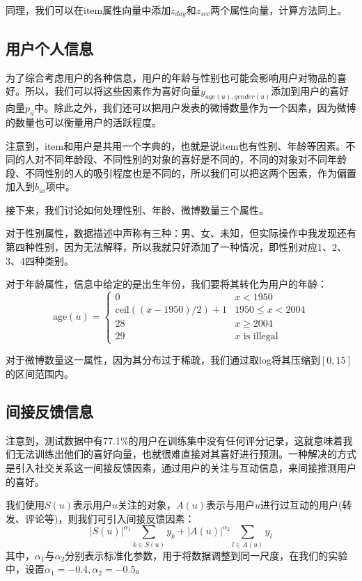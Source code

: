 \documentclass[12pt]{article} %
\newcommand\pp{\boldsymbol{\mathit{p}}}
\newcommand\yy{\boldsymbol{\mathit{y}}}
\newcommand\zz{\boldsymbol{\mathit{z}}}
\begin{document}
\begin{sloppypar}
同理，我们可以在item属性向量中添加$\zz_{day}$和$\zz_{sec}$两个属性向量，计算方法同上。


\subsection{用户个人信息}

为了综合考虑用户的各种信息，用户的年龄与性别也可能会影响用户对物品的喜好。所以，我们可以将这些因素作为喜好向量$\yy_{age(u),gender(u)}$添加到用户的喜好向量$\pp_u$中。除此之外，我们还可以把用户发表的微博数量作为一个因素，因为微博的数量也可以衡量用户的活跃程度。

注意到，item和用户是共用一个字典的，也就是说item也有性别、年龄等因素。不同的人对不同年龄段、不同性别的对象的喜好是不同的，不同的对象对不同年龄段、不同性别的人的吸引程度也是不同的，所以我们可以把这两个因素，作为偏置加入到$b_{ui}$项中。

接下来，我们讨论如何处理性别、年龄、微博数量三个属性。

对于性别属性，数据描述中声称有三种：男、女、未知，但实际操作中我发现还有第四种性别，因为无法解释，所以我就只好添加了一种情况，即性别对应1、2、3、4四种类别。

对于年龄属性，信息中给定的是出生年份，我们要将其转化为用户的年龄：
\begin{equation}
\text{age}(u) =
\begin{cases}
0 & x<1950 \\
\text{ceil}((x-1950)/2)+1& 1950\le x < 2004 \\
28 & x\ge 2004 \\
29 & x \text{ is illegal}
\end{cases}
\end{equation}

对于微博数量这一属性，因为其分布过于稀疏，我们通过取log将其压缩到$[0,15]$的区间范围内。


\subsection{间接反馈信息}

注意到，测试数据中有77.1\%的用户在训练集中没有任何评分记录，这就意味着我们无法训练出他们的喜好向量，也就很难直接对其喜好进行预测。一种解决的方式是引入社交关系这一间接反馈因素，通过用户的关注与互动信息，来间接推测用户的喜好。

我们使用$S(u)$表示用户$u$关注的对象，$A(u)$表示与用户$u$进行过互动的用户(转发、评论等)，则我们可引入间接反馈因素：
\begin{equation}
|S(u)|^{\alpha_1}\sum_{k\in S(u)} \yy_k + |A(u)|^{\alpha_2} \sum_{l\in A(u)} \yy_l
\end{equation}
其中，$\alpha_1$与$\alpha_2$分别表示标准化参数，用于将数据调整到同一尺度，在我们的实验中，设置$\alpha_1=-0.4,\alpha_2=-0.5$。



\end{sloppypar}
\end{document}
